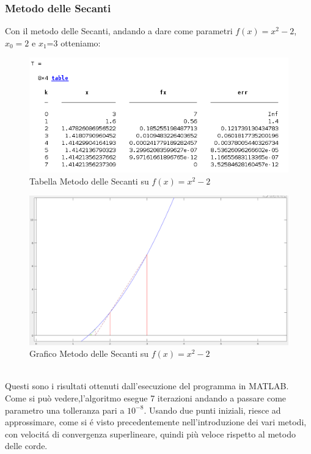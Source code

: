 \documentclass[12pt, letterpaper]{article}
\begin{document}
\subsubsection{Metodo delle Secanti}
Con il metodo delle Secanti, andando a dare come parametri $f(x)=x^2-2$, $x_0=2$ e $x_1$=3 otteniamo:
\begin{figure}[ht!]
    \includegraphics[scale=0.6]{TabellaParabolaSecant.png}
    \caption{Tabella Metodo delle Secanti su $f(x)=x^2-2$}
\end{figure}
\begin{figure}[ht!]
    \includegraphics[scale=0.42]{ParabolaSecant.png}
    \caption{Grafico Metodo delle Secanti  su $f(x)=x^2-2$}
\end{figure} \\

Questi sono i risultati ottenuti dall'esecuzione del programma in MATLAB.\\ Come si può vedere,l'algoritmo esegue 7 iterazioni andando a passare come parametro una tolleranza pari a $10^{-8}$.
Usando due punti iniziali, riesce ad approssimare, come si \'e visto precedentemente nell'introduzione dei vari metodi, con velocit\'a di convergenza superlineare, quindi più veloce rispetto al metodo delle corde.
\end{document}
